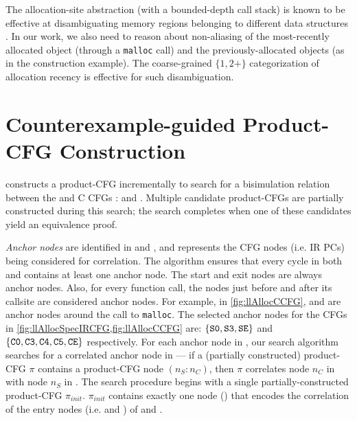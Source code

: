 The allocation-site abstraction (with a bounded-depth call stack) is
known to be effective at disambiguating memory regions belonging to
different data structures
\cite{allocationSiteAbstraction82,allocationSiteAbstraction90,allocationSiteAbstraction06}.
In our work, we also need to reason about non-aliasing
of the most-recently allocated object (through a {\tt malloc} call) and
the previously-allocated objects (as in the 
construction example). The coarse-grained $\{1, 2+\}$
categorization of allocation recency is effective for such disambiguation.



\section{Counterexample-guided Product-CFG Construction}
\label{sec:searchalgo}
\toolName{} constructs a product-CFG incrementally to search for a bisimulation relation
between the \SpecL{} and C CFGs : \sprog{} and \cprog{}.
Multiple candidate product-CFGs are partially constructed during this search;
the search completes when one of these candidates yield an equivalence proof.

{\em Anchor nodes} are identified in \sprog{} and \cprog{}, and represents the
CFG nodes (i.e. IR PCs) being considered for correlation.
The algorithm ensures that every cycle in both \sprog{} and \cprog{} contains at least one anchor node.
The start and exit nodes are always anchor nodes.
Also, for every function call, the nodes just before and after its callsite are considered anchor nodes.
For example, in \cref{fig:llAllocCCFG},  and  are anchor nodes around the call to {\tt malloc}.
The selected anchor nodes for the CFGs in \cref{fig:llAllocSpecIRCFG,fig:llAllocCCFG} are:
$\{ {\tt S0},{\tt S3},{\tt SE} \}$ and $\{ {\tt C0}, {\tt C3}, {\tt C4}, {\tt C5}, {\tt CE} \}$ respectively.
For each anchor node in \cprog{}, our search algorithm searches for a correlated anchor node in \sprog{} --- if
a (partially constructed) product-CFG $\pi$ contains a product-CFG node  $(n_S\!:\!n_C)$, then $\pi$
correlates node $n_C$ in \cprog{} with node $n_S$ in \sprog{}.
The search procedure begins with a single partially-constructed product-CFG $\pi_{init}$.
$\pi_{init}$ contains exactly one node () that encodes the correlation of the entry nodes
(i.e.  and ) of \sprog{} and \cprog{}.

